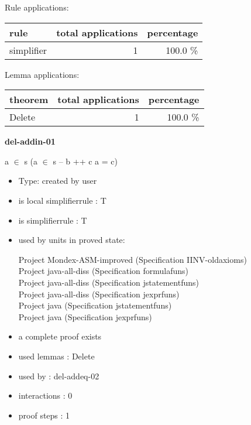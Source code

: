 \documentclass[a4paper]{article}
\begin{document}
Rule applications:

\begin{supertabular}{l|r|r}
rule	        & total applications & percentage \\ \hline
simplifier & 1 & 100.0 \% \\

\end{supertabular}

Lemma applications:

\begin{supertabular}{l|r|r}
theorem	        & total applications & percentage \\ \hline
Delete & 1 & 100.0 \% \\

\end{supertabular}
\pagebreak

{\LARGE\bf del-addin-01}\label{lemma-del-addin-01}

\medskip

 \Fol \Not a $\in$ s \Imp (a $\in$ s -- b ++ c \Equiv a = c)

\begin{itemize}

\item Type: created by user

\item is local simplifierrule : T
\item is simplifierrule : T
\item used by units in proved state:

Project Mondex-ASM-improved (Specification IINV-oldaxioms) \\
Project java-all-diss (Specification formulafuns) \\
Project java-all-diss (Specification jstatementfuns) \\
Project java-all-diss (Specification jexprfuns) \\
Project java (Specification jstatementfuns) \\
Project java (Specification jexprfuns)
\item       a complete proof exists
\item       used lemmas  : Delete
\item       used by      : del-addeq-02
\item       interactions : 0
\item       proof steps  : 1
\end{itemize}

\medskip
\end{document}
